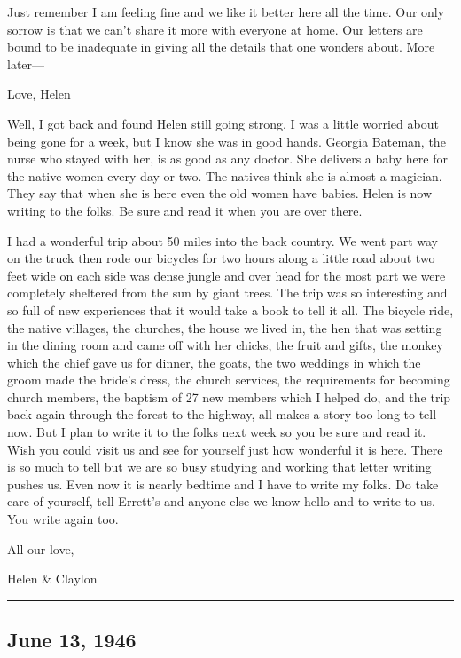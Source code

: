 \documentclass[
]{book}
\begin{document}
Just remember I am feeling fine and we like it better here all the time. Our only sorrow is that we can't share it more with everyone at home. Our letters are bound to be inadequate in giving all the details that one wonders about. More later---

Love, Helen

Well, I got back and found Helen still going strong. I was a little worried about being gone for a week, but I know she was in good hands. Georgia Bateman, the nurse who stayed with her, is as good as any doctor. She delivers a baby here for the native women every day or two. The natives think she is almost a magician. They say that when she is here even the old women have babies. Helen is now writing to the folks. Be sure and read it when you are over there.

I had a wonderful trip about 50 miles into the back country. We went part way on the truck then rode our bicycles for two hours along a little road about two feet wide on each side was dense jungle and over head for the most part we were completely sheltered from the sun by giant trees. The trip was so interesting and so full of new experiences that it would take a book to tell it all. The bicycle ride, the native villages, the churches, the house we lived in, the hen that was setting in the dining room and came off with her chicks, the fruit and gifts, the monkey which the chief gave us for dinner, the goats, the two weddings in which the groom made the bride's dress, the church services, the requirements for becoming church members, the baptism of 27 new members which I helped do, and the trip back again through the forest to the highway, all makes a story too long to tell now. But I plan to write it to the folks next week so you be sure and read it. Wish you could visit us and see for yourself just how wonderful it is here. There is so much to tell but we are so busy studying and working that letter writing pushes us. Even now it is nearly bedtime and I have to write my folks. Do take care of yourself, tell Errett's and anyone else we know hello and to write to us. You write again too.

All our love,

Helen \& Claylon

\begin{center}\rule{0.5\linewidth}{0.5pt}\end{center}

\hypertarget{june-13-1946}{%
\subsection{June 13, 1946}\label{june-13-1946}}
\end{document}
